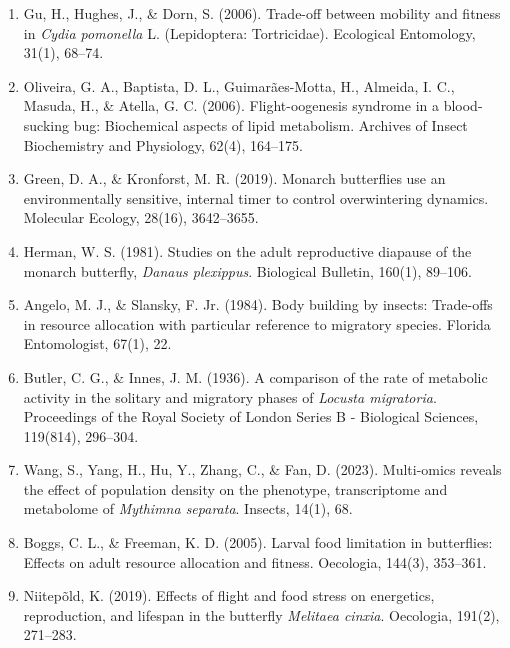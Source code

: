 \documentclass[lineno]{wiley-article}
\begin{document}
\begin{enumerate}
\item Gu, H., Hughes, J., \& Dorn, S. (2006). Trade-off between mobility and fitness in \textit{Cydia pomonella} L. (Lepidoptera: Tortricidae). Ecological Entomology, 31(1), 68–74.

\item Oliveira, G. A., Baptista, D. L., Guimarães-Motta, H., Almeida, I. C., Masuda, H., \& Atella, G. C. (2006). Flight-oogenesis syndrome in a blood-sucking bug: Biochemical aspects of lipid metabolism. Archives of Insect Biochemistry and Physiology, 62(4), 164–175.

\item Green, D. A., \& Kronforst, M. R. (2019). Monarch butterflies use an environmentally sensitive, internal timer to control overwintering dynamics. Molecular Ecology, 28(16), 3642–3655.

\item Herman, W. S. (1981). Studies on the adult reproductive diapause of the monarch butterfly, \textit{Danaus plexippus}. Biological Bulletin, 160(1), 89–106.

\item Angelo, M. J., \& Slansky, F. Jr. (1984). Body building by insects: Trade-offs in resource allocation with particular reference to migratory species. Florida Entomologist, 67(1), 22.


\item Butler, C. G., \& Innes, J. M. (1936). A comparison of the rate of metabolic activity in the solitary and migratory phases of \textit{Locusta migratoria}. Proceedings of the Royal Society of London Series B - Biological Sciences, 119(814), 296–304.

\item Wang, S., Yang, H., Hu, Y., Zhang, C., \& Fan, D. (2023). Multi-omics reveals the effect of population density on the phenotype, transcriptome and metabolome of \textit{Mythimna separata}. Insects, 14(1), 68.

\item Boggs, C. L., \& Freeman, K. D. (2005). Larval food limitation in butterflies: Effects on adult resource allocation and fitness. Oecologia, 144(3), 353–361.

\item Niitepõld, K. (2019). Effects of flight and food stress on energetics, reproduction, and lifespan in the butterfly \textit{Melitaea cinxia}. Oecologia, 191(2), 271–283.


\end{enumerate}
\end{document}
